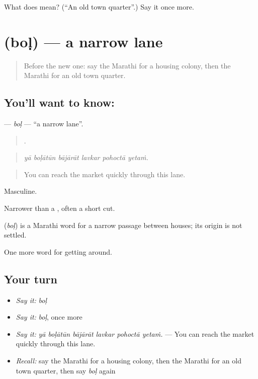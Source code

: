 \begin{tcolorbox}[breakable,colback=teal!4,colframe=teal!35!black,title={Before you move on}]
What does  mean? (\textquotedblleft{}An old town quarter\textquotedblright{}.) Say it once more.
\end{tcolorbox}
\section[\texorpdfstring{\mr{बोळ} (boḷ)}{बोळ (boḷ)}]{ (boḷ) — a narrow lane}

\label{lesson:MR-C419-bol}



\begin{quote}
Before the new one: say the Marathi for a housing colony, then the Marathi for an old town quarter.
\end{quote}

\subsection*{You'll want to know: }
\textbf{} — \emph{boḷ} — \textquotedblleft{}a narrow lane\textquotedblright{}.

\begin{quote}
     .
\end{quote}

\begin{quote}
\emph{yā boḷātūn bājārāt lavkar pohoctā yetaṁ.}
\end{quote}

\begin{quote}
You can reach the market quickly through this lane.
\end{quote}

Masculine.

Narrower than a , often a short cut.

\begin{cousinweb}
\textbf{} (\emph{boḷ}) is a Marathi word for a narrow passage between houses; its origin is not settled.
\end{cousinweb}

\begin{grammarlens}[title={What you've built}]
One more word for getting around.
\end{grammarlens}

\subsection*{Your turn}
\begin{itemize}
\raggedright
  \item \emph{Say it:} \emph{boḷ}
  \item \emph{Say it:} \emph{boḷ}, once more
  \item \emph{Say it:} \emph{yā boḷātūn bājārāt lavkar pohoctā yetaṁ.} — You can reach the market quickly through this lane.
  \item \emph{Recall:} say the Marathi for a housing colony, then the Marathi for an old town quarter, then say \emph{boḷ} again
\end{itemize}

